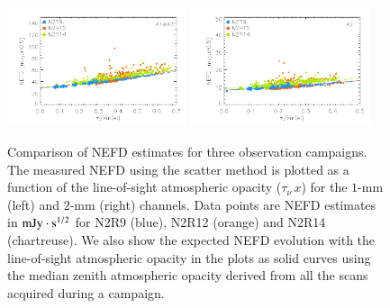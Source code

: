 \documentclass[traditionalabstract]{aa}
\newcommand{\taunu}{\tau_{\nu}}
\begin{document}
{\begin{figure}[!thbp]
\begin{center}
\includegraphics[clip=true,width=0.47\textwidth]{Figures/plot_nefd_vs_obstau_corrected_skydip_vfinal_1mm.pdf}
\includegraphics[clip=true,width=0.47\textwidth]{Figures/plot_nefd_vs_obstau_corrected_skydip_vfinal_a2.pdf}
\caption{Comparison of NEFD estimates for three observation
  campaigns. The measured NEFD using the scatter method is plotted as a function of the 
  line-of-sight atmospheric opacity ($\taunu\,x$) for the $1$-mm (left) and $2$-mm (right)
  channels. Data points are NEFD estimates in $\rm{mJy} \cdot s^{1/2}$ for N2R9 (blue), N2R12 (orange)
  and N2R14 (chartreuse). We also show the expected NEFD evolution
  with the line-of-sight atmospheric opacity in the plots as solid curves using the median
  zenith atmospheric opacity derived from all the scans acquired during a campaign.}
\label{fig:nefdvsbackground_below_1Jy}
\end{center}
\end{figure}

}
\end{document}
